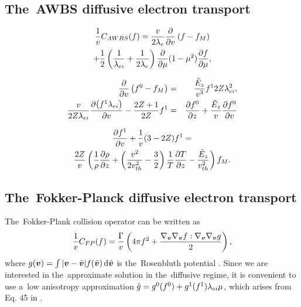 \subsection{The~AWBS diffusive electron transport}
\label{sec:AWBSDiffusiveRegime}

\begin{multline}
  \frac{1}{v}C_{AWBS}(f)
  = 
  \frac{v}{2\lambda_e} \frac{\partial{}}{\partial{v}}\left(f - f_M\right) \\
  + \frac{1}{2}\left(\frac{1}{\lambda_{ei}} + \frac{1}{2\lambda_e}\right)
  \frac{\partial{}}{\partial{\mu}}(1 - \mu^2)\frac{\partial{f}}{\partial{\mu}} ,
  \label{eq:OOE_AWBS_model_1D}
\end{multline}

\begin{eqnarray}
  \frac{\partial{}}{\partial{v}}\left( f^0 -f_M\right) &=& 
  \frac{\tilde{E}_z}{v^3}f^1 2Z\lambda_{ei}^2 ,
  \label{eq:AWBS_f0} \\
  \frac{v}{2Z\lambda_{ei}}\frac{\partial{\left(f^1 \lambda_{ei}\right)}}{\partial{v}}  
  - \frac{2Z + 1}{2Z} f^1 &=&
  \frac{\partial{f^0}}{\partial{z}} + \frac{\tilde{E}_z}{v}\frac{\partial{f^0}}{\partial{v}}
  \nonumber 
\end{eqnarray}

\begin{multline}
  \frac{\partial{f^1}}{\partial{v}} + \frac{1}{v}(3-2Z)f^1
  = \\
  \frac{2Z}{v}\left(\frac{1}{\rho}\frac{\partial{\rho}}{\partial{z}} + 
  \left( \frac{v^2}{2 v_{th}^2} - \frac{3}{2}\right)
  \frac{1}{T}\frac{\partial{T}}{\partial{z}} - \frac{\tilde{E}_z}{v_{th}^2}\right)f_M .
  \label{eq:AWBS_f1}
\end{multline}

\subsection{The~Fokker-Planck diffusive electron transport}
\label{sec:FPDiffusiveRegime}
\newcommand{\gt}{g}
\newcommand{\gM}{\gt_M}

The~Fokker-Plank collision operator can be written as 
\cite{Shkarofsky_Particle_Kinetics_book_1966_24}
\begin{equation}
  \frac{1}{\vmag}C_{FP}(f) =  
  \frac{\Gamma}{\vmag} \left(4\pi f^2 
  + \frac{\gv\gv \ft : \gv\gv \gt}{2}\right) ,
  \nonumber
\end{equation}
where $g(\boldsymbol{v}) = \int |\boldsymbol{v} - \tilde{\boldsymbol{v}}| f(\tilde{\boldsymbol{v}})\, \text{d}\tilde{\boldsymbol{v}}$ is 
the~Rosenbluth potential \cite{Rosenbluth_PR1957}. Since we are interested in 
the~approximate solution in the~diffusive regime, it is convenient to
use a~low anisotropy approximation 
$\tilde{\gt} = \gt^0(f^0) + \gt^1(f^1) \mfpei \mu$, which arises from 
Eq. 45 in \cite{Rosenbluth_PR1957}.

